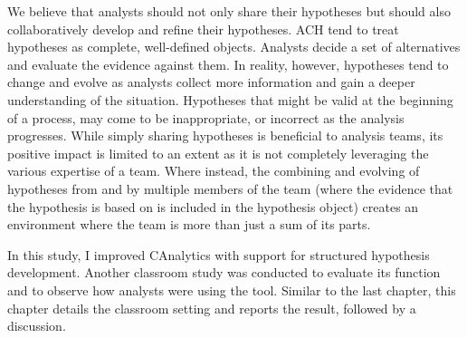 We believe that analysts should not only share their hypotheses but should also collaboratively develop and refine their hypotheses. ACH tend to treat hypotheses as complete, well-defined objects. Analysts decide a set of alternatives and evaluate the evidence against them. In reality, however, hypotheses tend to change and evolve as analysts collect more information and gain a deeper understanding of the situation. Hypotheses that might be valid at the beginning of a process, may come to be inappropriate, or incorrect as the analysis progresses. While simply sharing hypotheses is beneficial to analysis teams, its positive impact is limited to an extent as it is not completely leveraging the various expertise of a team. Where instead, the combining and evolving of hypotheses from and by multiple members of the team (where the evidence that the hypothesis is based on is included in the hypothesis object) creates an environment where the team is more than just a sum of its parts.

In this study, I improved CAnalytics with support for structured hypothesis development. Another classroom study was conducted to evaluate its function and to observe how analysts were using the tool. Similar to the last chapter, this chapter details the classroom setting and reports the result, followed by a discussion.



